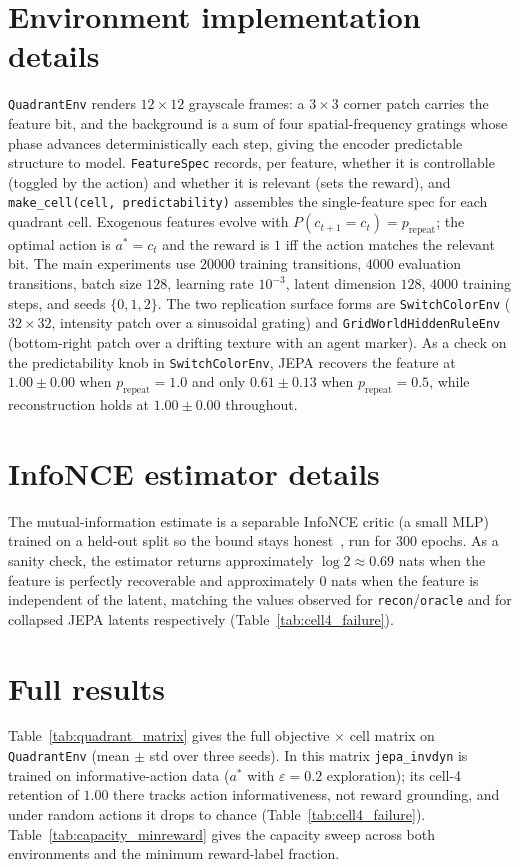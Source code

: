 \documentclass[11pt]{article}
\begin{document}
\appendix
\section{Environment implementation details}
\label{app:env}
\texttt{QuadrantEnv} renders $12\times12$ grayscale frames: a $3\times3$ corner patch carries the
feature bit, and the background is a sum of four spatial-frequency gratings whose phase advances
deterministically each step, giving the encoder predictable structure to model. \texttt{FeatureSpec}
records, per feature, whether it is controllable (toggled by the action) and whether it is relevant
(sets the reward), and \texttt{make\_cell(cell, predictability)} assembles the single-feature spec
for each quadrant cell. Exogenous features evolve with $P(c_{t+1}=c_t)=p_{\text{repeat}}$; the
optimal action is $a^\ast=c_t$ and the reward is $1$ iff the action matches the relevant bit. The
main experiments use $20000$ training transitions, $4000$ evaluation transitions, batch size $128$,
learning rate $10^{-3}$, latent dimension $128$, $4000$ training steps, and seeds $\{0,1,2\}$. The
two replication surface forms are \texttt{SwitchColorEnv} ($32\times32$, intensity patch over a
sinusoidal grating) and \texttt{GridWorldHiddenRuleEnv} (bottom-right patch over a drifting texture
with an agent marker). As a check on the predictability knob in \texttt{SwitchColorEnv}, JEPA
recovers the feature at $1.00\pm0.00$ when $p_{\text{repeat}}=1.0$ and only $0.61\pm0.13$ when
$p_{\text{repeat}}=0.5$, while reconstruction holds at $1.00\pm0.00$ throughout.

\section{InfoNCE estimator details}
\label{app:infonce}
The mutual-information estimate is a separable InfoNCE critic (a small MLP) trained on a held-out
split so the bound stays honest~\citep{oord2018cpc}, run for $300$ epochs. As a sanity check, the
estimator returns approximately $\log 2\approx0.69$ nats when the feature is perfectly recoverable
and approximately $0$ nats when the feature is independent of the latent, matching the values
observed for \texttt{recon}/\texttt{oracle} and for collapsed JEPA latents respectively
(Table~\ref{tab:cell4_failure}).

\section{Full results}
\label{app:full}
Table~\ref{tab:quadrant_matrix} gives the full objective $\times$ cell matrix on
\texttt{QuadrantEnv} (mean $\pm$ std over three seeds). In this matrix \texttt{jepa\_invdyn} is
trained on informative-action data ($a^\ast$ with $\varepsilon=0.2$ exploration); its cell-4
retention of $1.00$ there tracks action informativeness, not reward grounding, and under random
actions it drops to chance (Table~\ref{tab:cell4_failure}). Table~\ref{tab:capacity_minreward} gives
the capacity sweep across both environments and the minimum reward-label fraction.
\end{document}
